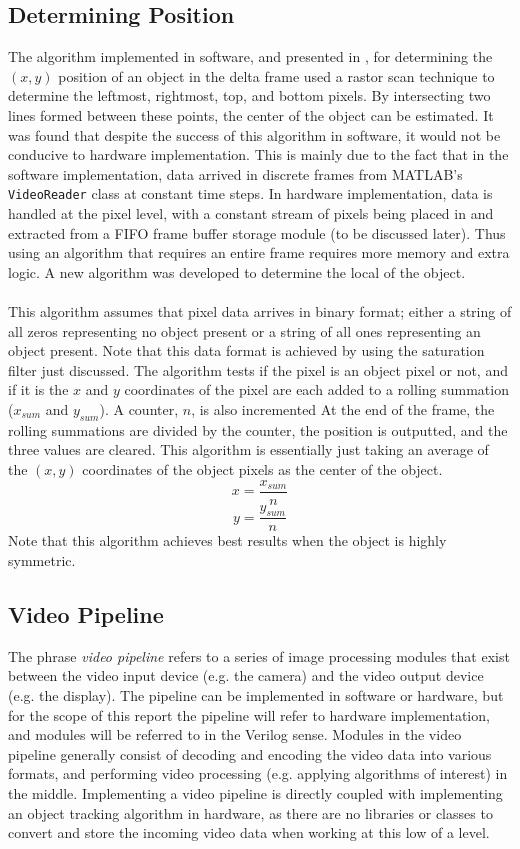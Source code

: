 \documentclass[11pt]{article} %
\begin{document}
\subsection{Determining Position}
The algorithm implemented in software, and presented in \cite{15}, for determining the $(x,y)$ position of an object in the delta frame used a rastor scan technique to determine the leftmost, rightmost, top, and bottom pixels. By intersecting two lines formed between these points, the center of the object can be estimated. It was found that despite the success of this algorithm in software, it would not be conducive to hardware implementation. This is mainly due to the fact that in the software implementation, data arrived in discrete frames from MATLAB's \texttt{VideoReader} class at constant time steps. In hardware implementation, data is handled at the pixel level, with a constant stream of pixels being placed in and extracted from a FIFO frame buffer storage module (to be discussed later). Thus using an algorithm that requires an entire frame requires more memory and extra logic. A new algorithm was developed to determine the local of the object. \\\\
This algorithm assumes that pixel data arrives in binary format; either a string of all zeros representing no object present or a string of all ones representing an object present. Note that this data format is achieved by using the saturation filter just discussed. The algorithm tests if the pixel is an object pixel or not, and if it is the $x$ and $y$ coordinates of the pixel are each added to a rolling summation ($x_{sum}$ and $y_{sum}$). A counter, $n$, is also incremented At the end of the frame, the rolling summations are divided by the counter, the position is outputted, and the three values are cleared. This algorithm is essentially just taking an average of the $(x,y)$ coordinates of the object pixels as the center of the object.
\begin{equation}
x = \frac{x_{sum}}{n}
\end{equation} 
\begin{equation}
y = \frac{y_{sum}}{n}
\end{equation} 
Note that this algorithm achieves best results when the object is highly symmetric.
\subsection{Video Pipeline}
The phrase \textit{video pipeline} refers to a series of image processing modules that exist between the video input device (e.g. the camera) and the video output device (e.g. the display). The pipeline can be implemented in software or hardware, but for the scope of this report the pipeline will refer to hardware implementation, and modules will be referred to in the Verilog sense. Modules in the video pipeline generally consist of decoding and encoding the video data into various formats, and performing video processing (e.g. applying algorithms of interest) in the middle. Implementing a video pipeline is directly coupled with implementing an object tracking algorithm in hardware, as there are no libraries or classes to convert and store the incoming video data when working at this low of a level.
\end{document}
